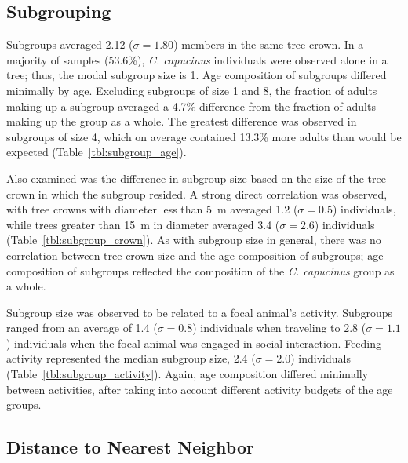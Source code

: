 \documentclass{../../../coursework}
\begin{document}
\subsection{Subgrouping}

Subgroups averaged 2.12 (\(\sigma = 1.80\)) members in the same tree crown. In
a majority of samples (53.6\%), \emph{C. capucinus} individuals were observed
alone in a tree; thus, the modal subgroup size is 1. Age composition of
subgroups differed minimally by age. Excluding subgroups of size 1 and 8, the
fraction of adults making up a subgroup averaged a 4.7\% difference from the
fraction of adults making up the group as a whole. The greatest difference was
observed in subgroups of size 4, which on average contained 13.3\% more adults
than would be expected (Table~\ref{tbl:subgroup_age}).

Also examined was the difference in subgroup size based on the size of the
tree crown in which the subgroup resided. A strong direct correlation was
observed, with tree crowns with diameter less than \SI{5}{\metre} averaged 1.2
(\(\sigma = 0.5\)) individuals, while trees greater than \SI{15}{\metre} in
diameter averaged 3.4 (\(\sigma = 2.6\)) individuals
(Table~\ref{tbl:subgroup_crown}). As with subgroup size in general, there was
no correlation between tree crown size and the age composition of subgroups;
age composition of subgroups reflected the composition of the
\emph{C. capucinus} group as a whole.

Subgroup size was observed to be related to a focal animal's activity.
Subgroups ranged from an average of 1.4 (\(\sigma = 0.8\)) individuals when
traveling to 2.8 (\(\sigma = 1.1\)) individuals when the focal animal was
engaged in social interaction. Feeding activity represented the median
subgroup size, 2.4 (\(\sigma = 2.0\)) individuals
(Table~\ref{tbl:subgroup_activity}). Again, age composition differed minimally
between activities, after taking into account different activity budgets of
the age groups.

\subsection{Distance to Nearest Neighbor}
\end{document}
